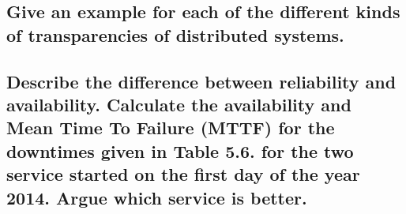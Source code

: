 \documentclass[a4paper,
			llpt,
			solution,
			accentcolor=tud2d,
			colorbacktitle
			]
			{tudexercise}
\begin{document}
\subsection{Give an example for each of the different kinds of transparencies of distributed systems.}
\subsection{Describe the difference between reliability and availability. Calculate the availability and Mean Time To Failure (MTTF) for the downtimes given in Table 5.6. for the two service started on the first day of the year 2014. Argue which service is better.}
\end{document}
